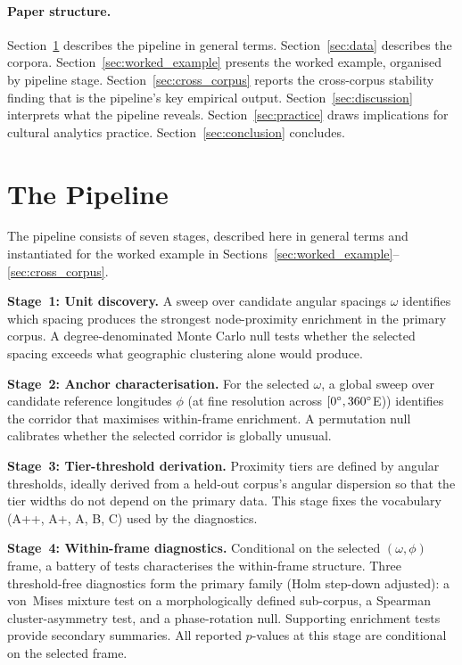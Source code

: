 \documentclass[12pt,a4paper]{article}
\newcommand{\degr}{\ifmmode{^\circ}\else\textdegree{}\fi}
\begin{document}
\paragraph{Paper structure.}
Section~\ref{sec:pipeline} describes the pipeline in general terms.
Section~\ref{sec:data} describes the corpora.
Section~\ref{sec:worked_example} presents the worked example, organised
by pipeline stage.
Section~\ref{sec:cross_corpus} reports the cross-corpus stability
finding that is the pipeline's key empirical output.
Section~\ref{sec:discussion} interprets what the pipeline reveals.
Section~\ref{sec:practice} draws implications for cultural analytics
practice. Section~\ref{sec:conclusion} concludes.

\section{The Pipeline}
\label{sec:pipeline}

The pipeline consists of seven stages, described here in general terms
and instantiated for the worked example in
Sections~\ref{sec:worked_example}--\ref{sec:cross_corpus}.

\textbf{Stage~1: Unit discovery.} A sweep over candidate angular
spacings $\omega$ identifies which spacing produces the strongest
node-proximity enrichment in the primary corpus. A degree-denominated
Monte Carlo null tests whether the selected spacing exceeds what
geographic clustering alone would produce.

\textbf{Stage~2: Anchor characterisation.} For the selected $\omega$,
a global sweep over candidate reference longitudes $\phi$ (at fine
resolution across $[0\degr{}, 360\degr{}$E)) identifies the corridor
that maximises within-frame enrichment. A permutation null calibrates
whether the selected corridor is globally unusual.

\textbf{Stage~3: Tier-threshold derivation.} Proximity tiers are defined
by angular thresholds, ideally derived from a held-out corpus's
angular dispersion so that the tier widths do not depend on the primary
data. This stage fixes the vocabulary (A++, A+, A, B, C) used by the
diagnostics.

\textbf{Stage~4: Within-frame diagnostics.} Conditional on the selected
$(\omega, \phi)$ frame, a battery of tests characterises the within-frame
structure. Three threshold-free diagnostics form the primary family
(Holm step-down adjusted): a von~Mises mixture test on a
morphologically defined sub-corpus, a Spearman cluster-asymmetry test,
and a phase-rotation null. Supporting enrichment tests provide secondary
summaries. All reported $p$-values at this stage are conditional on
the selected frame.
\end{document}

